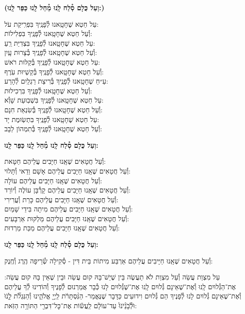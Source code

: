 \documentclass[twoside, openany, parskip=half, 11pt]{book}
\begin{document}
\textbf{(וְעַל כֻּלָם סְ֯לַח לָֽנוּ מְ֯חַל לָֽנוּ כַּפֵּר לָֽנוּ:)}

עַל חֵטְא שֶׁחָטָֽאנוּ לְ֯פָנֶֽיךָ בִּפְרִֽיקַת עֹל:\\ וְ֯עַל חֵטְא שֶׁחָטָֽאנוּ לְ֯פָנֶֽיךָ בִּפְלִילוֹת: \\
עַל חֵטְא שֶׁחָטָֽאנוּ לְ֯פָנֶֽיךָ בִּצְדִיַּת רֵֽעַ: \\ וְ֯עַל חֵטְא שֶׁחָטָֽאנוּ לְ֯פָנֶֽיךָ בְּ֯צָרוּת עָֽיִן: \\
עַל חֵטְא שֶׁחָטָֽאנוּ לְ֯פָנֶֽיךָ בְּ֯קַלּוּת רֹאשׁ:\\ וְ֯עַל חֵטְא שֶׁחָטָֽאנוּ לְ֯פָנֶֽיךָ בְּ֯קַשְׁיוּת עֹֽרֶף: \\
עַ״חֵ שֶׁחָטָֽאנוּ לְ֯פָנֶֽיךָ בְּ֯רִיצַת רַגְלַֽיִם לְ֯הָרַע:\\ וְ֯עַל חֵטְא שֶׁחָטָֽאנוּ לְ֯פָנֶֽיךָ בִּרְכִילוּת: \\
עַל חֵטְא שֶׁחָטָֽאנוּ לְ֯פָנֶֽיךָ בִּשְׁבֽוּעַת שָׁוְ֯א: \\ וְ֯עַל חֵטְא שֶׁחָטָֽאנוּ לְ֯פָנֶֽיךָ בְּ֯שִׂנְאַת חִנָם: \\
עַל חֵטְא שֶׁחָטָֽאנוּ לְ֯פָנֶֽיךָ בִּתְשֽׂוּמֶת יָד:\\ וְ֯עַל חֵטְא שֶׁחָטָֽאנוּ לְ֯פָנֶֽיךָ בְּ֯תִמְהוֹן לֵבָב:

\textbf{וְעַל כֻּלָם סְ֯לַח לָֽנוּ מְ֯חַל לָֽנוּ כַּפֵּר לָֽנוּ:}


וְ֯עַל חֲטָאִים שֶׁאָֽנוּ חַיָּבִים עֲלֵיהֶם חַטָּאת:\\
וְ֯עַל חֲטָאִים שֶׁאָֽנוּ חַיָּבִים עֲלֵיהֶם אָשָׁם וַדַאי וְ֯תָּלוּי:\\
וְ֯עַל חֲטָאִים שֶׁאָֽנוּ חַיָּבִים עֲלֵיהֶם עוֹלָה:\\
וְ֯עַל חֲטָאִים שֶׁאָֽנוּ חַיָּבִים עֲלֵיהֶם קָרְ֯בָּן עוֹלֶה וְ֯יוֹרֵד:\\
וְ֯עַל חֲטָאִים שֶׁאָֽנוּ חַיָּבִים עֲלֵיהֶם כָּרֵת וְ֯עֲרִירִי:\\
וְ֯עַל חֲטָאִים שֶׁאָֽנוּ חַיָּבִים עֲלֵיהֶם מִיתָה בִּידֵי שָׁמַיִם:\\
וְ֯עַל חֲטָאִים שֶׁאָֽנוּ חַיָּבִים עֲלֵיהֶם מַּלְקּוּת אַרְבָּעִים:\\
וְ֯עַל חֲטָאִים שֶׁאָֽנוּ חַיָּבִים עֲלֵיהֶם מַכַּת מַרְדוּת:



\textbf{וְעַל כֻּלָם סְ֯לַח לָֽנוּ מְ֯חַל לָֽנוּ כַּפֵּר לָֽנוּ:}

וְ֯עַל חֲטָאִים שֶׁאָֽנוּ חַיָּיבִים עֲלֵיהֶם אַרְבַּע מִיתוֹת בֵּית דִּין - סְ֯קִילָה שְׂ֯רֵיפָה הֶֽרֶג וְ֯חֶֽנֶק:

עַל מִצְוַת עֲשֵׂה וְ֯עַל מִצְוַת לֹא תַעֲשֶׂה בֵּין שֶׁיֵשׁ־בָּהּ קוּם עֲשֵׂה וּבֵין שֶׁאֵין בָּהּ קוּם עֲשֵׂה: אֶת־הַגְּ֯לוּיִם לָֽנוּ וְ֯אֶת־שֶׁאֵינָם גְּ֯לוּיִם לָֽנוּ אֶת־שֶׁגְּ֯לוּיִם לָנוּ כְּ֯בָר אֲמַרְנוּם לְ֯פָנֶיךָ וְ֯הוֹדִינוּ לְ֯ךָ עֲלֵיהֶם וְ֯אֶת־שֶׁאֵינָם גְּ֯לוּיִם לָנוּ לְ֯פָנֶיךָ הֵם גְּ֯לוּיִם וִידוּעִים כַּדָּבָר שֶׁנֶּאֱמַר- הַנִּ֨סְתָּרֹ֔ת
לַֽיְיָ֖ אֱלֹהֵ֑ינוּ וְ֯הַנִּגְלֹ֞ת לָֹ֤נֹוֹּ וֹּלְֹ֯בָֹנֵֹ֨יֹנֹוֹּ֙ עַד־עוֹלָ֔ם לַֽעֲשׂ֕וֹת אֶת־כׇּל־דִּבְרֵ֖י הַתּוֹרָ֥ה הַזֹּֽאת:
\end{document}
